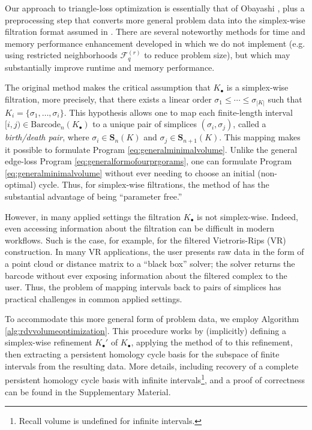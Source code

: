 \documentclass[11pt,onecolumn]{article}
\newcommand{\Simplices}[0]{\mathbf{S}}
\newcommand{\barcode}{\mathrm{Barcode}}
\newcommand{\simplex}{\sigma}
\theoremstyle{plain}
\theoremstyle{definition}
\begin{document}
Our approach to triangle-loss optimization is essentially that of Obayashi \cite{Obayashi2018}, plus a preprocessing step that converts more general problem data into the simplex-wise filtration format assumed in \cite{Obayashi2018}.  There are several noteworthy methods for time and memory performance enhancement developed in \cite{Obayashi2018}  which we do not implement (e.g.  using restricted neighborhoods $\mathcal{F}_q^{(r)}$ to reduce problem size), but which may substantially improve runtime and memory performance.
 
The original method makes the critical assumption that $K_\bullet$ is a simplex-wise filtration, more precisely, that there exists a linear order $\sigma_1 \le \cdots \le \sigma_{|K|}$ such that $K_i = \{\simplex_1, \ldots, \simplex_i\}$. This hypothesis allows one to map each finite-length interval $[i,j) \in \barcode_n(K_\bullet)$ to a unique pair of simplices $(\simplex_i, \simplex_j)$, called a \emph{birth/death pair}, where  $\sigma_i \in \Simplices_n(K)$ and $\sigma_j \in \Simplices_{n+1}(K)$.    This mapping makes it possible to formulate Program \eqref{eq:generalminimalvolume}. Unlike the general edge-loss Program \eqref{eq:generalformofourprgorams}, one can formulate Program \eqref{eq:generalminimalvolume} without ever needing to choose an initial (non-optimal) cycle.  Thus, for simplex-wise filtrations, the method of \cite{Obayashi2018} has the substantial advantage of being ``parameter free.''

 
However, in many applied settings the filtration $K_\bullet$ is not simplex-wise.   Indeed, even accessing information about the filtration can be difficult in modern workflows.  Such is the case, for example, for the filtered Vietroris-Rips (VR) construction. In many VR applications, the user  presents raw data in the form of a point cloud or distance matrix to a ``black box'' solver; the solver returns the barcode without ever exposing information about the filtered complex to the user. Thus, the problem of mapping intervals back to pairs of simplices has practical challenges in common applied settings.




 
To accommodate this more general form of problem data, we employ Algorithm \ref{alg:rdvvolumeoptimization}.  This procedure works by (implicitly) defining a simplex-wise refinement $K_\bullet'$ of $K_\bullet$, applying the method of \cite{Obayashi2018} to this refinement, then extracting a persistent homology cycle basis for the subspace of finite intervals from the resulting data.
 More details, including recovery of a complete persistent homology cycle basis with infinite intervals\footnote{Recall volume is undefined for infinite intervals.}, and a proof of correctness can be found in the Supplementary Material.
\end{document}
